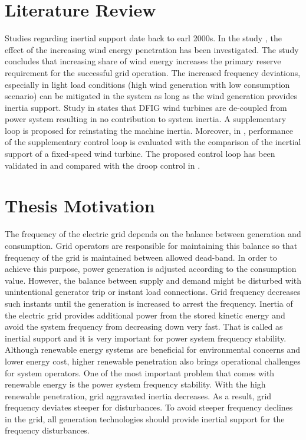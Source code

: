 \section{Literature Review}
Studies regarding inertial support date back to earl 2000s. In the study \cite{Lalor2004}, the effect of the increasing wind energy penetration has been investigated. The study concludes that increasing share of wind energy increases the primary reserve requirement for the successful grid operation. The increased frequency deviations, especially in light load conditions (high wind generation with low consumption scenario) can be mitigated in the system as long as the wind generation provides inertia support. Study in \cite{Ekanayake2003} states that DFIG wind turbines are de-coupled from power system resulting in no contribution to system inertia. A supplementary loop is proposed for reinstating the machine inertia. Moreover, in \cite{Ekanayake2004}, performance of the  supplementary control loop is evaluated with the comparison of the inertial support of a fixed-speed wind turbine. The proposed control loop has been validated in \cite{Morren2006} and compared with the droop control in \cite{Morren2006a}.



\section{Thesis Motivation}
The frequency of the electric grid depends on the balance between generation and consumption. Grid operators are responsible for maintaining this balance so that frequency of the grid is maintained between allowed dead-band. In order to achieve this purpose, power generation is adjusted according to the consumption value. However, the balance between supply and demand might be disturbed with unintentional generator trip or instant load connections. Grid frequency decreases such instants until the generation is increased to arrest the frequency. Inertia of the electric grid provides additional power from the stored kinetic energy and avoid the system frequency from decreasing down very fast. That is called as inertial support and it is very important for power system frequency stability.\\

Although renewable energy systems are beneficial for environmental concerns and lower energy cost, higher renewable penetration also brings operational challenges for system operators. One of the most important problem that comes with renewable energy is the power system frequency stability. With the high renewable penetration, grid aggravated inertia decreases. As a result, grid frequency deviates steeper for disturbances. To avoid steeper frequency declines in the grid, all generation technologies should provide inertial support for the frequency disturbances.



















